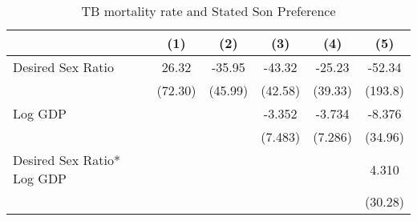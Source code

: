 \documentclass[10pt,letterpaper,subeqn]{beamer}
\begin{document}
\begin{frame}[label=placebo2]
%
\begin{table}[htbp]\centering
\def\sym#1{\ifmmode^{#1}\else\(^{#1}\)\fi}
\scriptsize
\caption{TB mortality rate and Stated Son Preference}
\begin{tabular}{l*{5}{c}}
\hline\hline
            &\multicolumn{1}{c}{(1)}&\multicolumn{1}{c}{(2)}&\multicolumn{1}{c}{(3)}&\multicolumn{1}{c}{(4)}&\multicolumn{1}{c}{(5)}\\
\hline
Desired Sex Ratio         &       26.32         &      -35.95         &      -43.32         &      -25.23         &      -52.34         \\
            &     (72.30)         &     (45.99)         &     (42.58)         &     (39.33)         &     (193.8)         \\

Log GDP        &                     &                     &      -3.352         &      -3.734         &      -8.376         \\
            &                     &                     &     (7.483)         &     (7.286)         &     (34.96)         \\


Desired Sex Ratio* Log GDP     &                     &                     &                     &                     &       4.310         \\
            &                     &                     &                     &                     &     (30.28)         \\


\end{tabular}
\end{table}
\end{frame}
\end{document}
